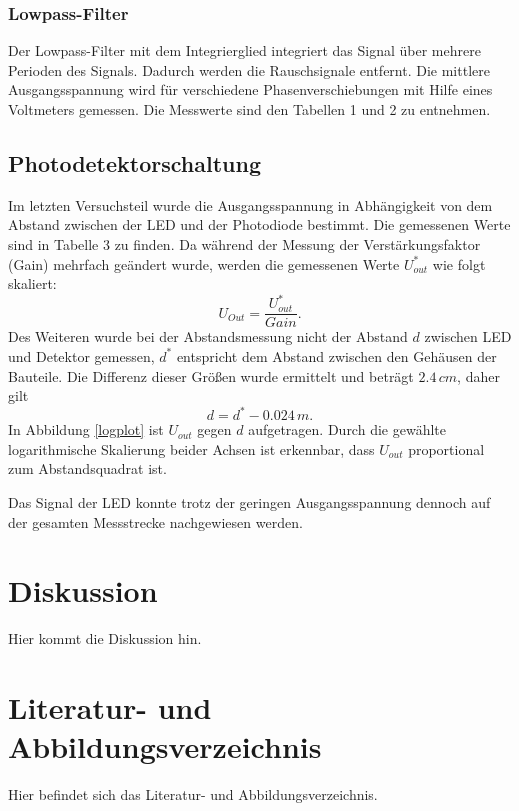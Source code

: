\documentclass[11pt]{article}
\begin{document}
\subsubsection{Lowpass-Filter}
Der Lowpass-Filter mit dem Integrierglied integriert das Signal über mehrere Perioden des Signals. Dadurch werden die Rauschsignale entfernt. Die mittlere Ausgangsspannung wird für verschiedene Phasenverschiebungen mit Hilfe eines Voltmeters gemessen. Die Messwerte sind den Tabellen 1 und 2 zu entnehmen.

\subsection{Photodetektorschaltung}
Im letzten Versuchsteil wurde die Ausgangsspannung in Abhängigkeit von dem Abstand zwischen der LED und der Photodiode bestimmt. Die gemessenen Werte sind  in Tabelle 3 zu finden. Da während der Messung der Verstärkungsfaktor (Gain) mehrfach geändert wurde, werden die gemessenen Werte $U_{out}^*$ wie folgt skaliert:
\begin{equation}
U_{Out} = \frac{U_{out}^*}{Gain}.
\end{equation} 
Des Weiteren wurde bei der Abstandsmessung nicht der Abstand $d$ zwischen LED und Detektor gemessen, $d^*$ entspricht dem Abstand zwischen den Gehäusen der Bauteile. Die Differenz dieser Größen wurde ermittelt und beträgt $2.4 \,cm$, daher gilt 
\begin{equation}
d = d^* - 0.024\,m .
\end{equation}
In  Abbildung \ref{logplot} ist $U_{out}$ gegen $d$ aufgetragen. Durch die gewählte logarithmische Skalierung beider Achsen ist erkennbar, dass $U_{out}$ proportional zum Abstandsquadrat ist.

\noindent
Das Signal der LED konnte trotz der geringen Ausgangsspannung dennoch auf der gesamten Messstrecke nachgewiesen werden. 


\section{Diskussion}
Hier kommt die Diskussion hin.
\section{Literatur- und Abbildungsverzeichnis}
Hier befindet sich das Literatur- und Abbildungsverzeichnis.
\end{document}
